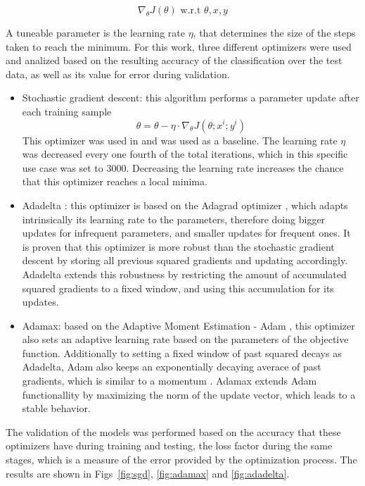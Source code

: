 \begin{equation}
    \nabla_\theta J(\theta) \text{  w.r.t } \theta, x, y
\end{equation}

A tuneable parameter is the learning rate \(\eta\), that determines the size of the steps taken to reach the minimum. For this work, three different optimizers were used and analized based on the resulting accuracy of the classification over the test data, as well as its value for error during validation.

\begin{itemize}
    \item Stochastic gradient descent: this algorithm performs a parameter update after each training sample
        \begin{equation}
            \theta = \theta - \eta \cdot \nabla_\theta J(\theta;x^i;y^i)
        \end{equation}
        This optimizer was used in \cite{Paisana2017} and was used as a baseline. The learning rate \(\eta\) was decreased every one fourth of the total iterations, which in this specific use case was set to 3000. Decreasing the learning rate increases the chance that this optimizer reaches a local minima.
    \item Adadelta \cite{Zeiler2012a}: this optimizer is based on the Adagrad optimizer \cite{Duchi2011}, which adapts intrinsically its learning rate to the parameters, therefore doing bigger updates for infrequent parameters, and smaller updates for frequent ones. It is proven that this optimizer is more robust than the stochastic gradient descent \cite{Duchi2011} by storing all previous squared gradients and updating accordingly. Adadelta extends this robustness by restricting the amount of accumulated squared gradients to a fixed window, and using this accumulation for its updates.
    \item Adamax: based on the Adaptive Moment Estimation - Adam \cite{Kingma2014}, this optimizer also sets an adaptive learning rate based on the parameters of the objective function. Additionally to setting a fixed window of past squared decays as Adadelta, Adam also keeps an exponentially decaying averace of past gradients, which is similar to a momentum \cite{Dahl2013}. Adamax extends Adam functionallity by maximizing the norm of the update vector, which leads to a stable behavior.
\end{itemize}

The validation of the models was performed based on the accuracy that these optimizers have during training and testing, the loss factor during the same stages, which is a measure of the error provided by the optimization process. The results are shown in Figs~\ref{fig:sgd}, \ref{fig:adamax} and \ref{fig:adadelta}.

